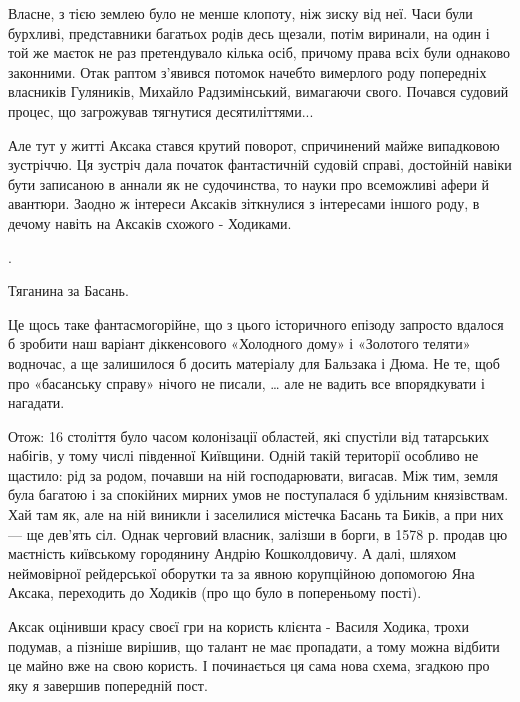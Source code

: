 Власне, з тією землею було не менше клопоту, ніж зиску від неї. Часи були
бурхливі, представники багатьох родів десь щезали, потім виринали, на один і
той же маєток не раз претендувало кілька осіб, причому права всіх були однаково
законними. Отак раптом з’явився потомок начебто вимерлого роду попередніх
власників Гуляників, Михайло Радзимінський, вимагаючи свого. Почався судовий
процес, що загрожував тягнутися десятиліттями...

Але тут у житті Аксака стався крутий поворот, спричинений майже випадковою
зустріччю. Ця зустріч дала початок фантастичній судовій справі, достойній
навіки бути записаною в аннали як не судочинства, то науки про всеможливі афери
й авантюри. Заодно ж інтереси Аксаків зіткнулися з інтересами іншого роду, в
дечому навіть на Аксаків схожого - Ходиками.

.

Тяганина за Басань.

Це щось таке фантасмогорійне, що з цього історичного епізоду запросто вдалося б
зробити наш варіант діккенсового «Холодного дому» і «Золотого теляти» водночас,
а ще залишилося б досить матеріалу для Бальзака і Дюма. Не те, щоб про
«басанську справу» нічого не писали, … але не вадить все впорядкувати і
нагадати. 

Отож: 16 століття було часом колонізації областей, які спустіли від татарських
набігів, у тому числі південної Київщини. Одній такій території особливо не
щастило: рід за родом, почавши на ній господарювати, вигасав. Між тим, земля
була багатою і за спокійних мирних умов не поступалася б удільним князівствам.
Хай там як, але на ній виникли і заселилися містечка Басань та Биків, а при них
— ще дев’ять сіл. Однак черговий власник, залізши в борги, в 1578 р. продав цю
маєтність київському городянину Андрію Кошколдовичу. А далі, шляхом неймовірної
рейдерської оборутки та за явною корупційною допомогою Яна Аксака, переходить
до Ходиків (про що було в попереньому пості).

Аксак оцінивши красу своєї гри на користь клієнта - Василя Ходика, трохи
подумав, а пізніше вирішив, що талант не має пропадати, а тому можна відбити це
майно вже на свою користь. І починається ця сама нова схема, згадкою про яку я
завершив попередній пост.

